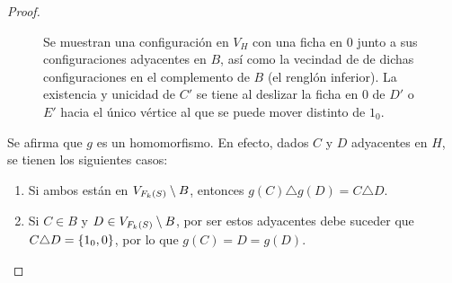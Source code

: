 \begin{proof}
\begin{figure}[!htbp]
        \captionsetup{font=footnotesize}
        \caption{Se muestran una configuraci\'on en $V_H$ con una ficha en $0$
        junto a sus configuraciones adyacentes en $B$, as\'i como la vecindad de
        de dichas configuraciones en el complemento de $B$ (el rengl\'on
        inferior). La existencia y unicidad de $C'$ se tiene al deslizar la
        ficha en $0$ de $D'$ o $E'$ hacia el \'unico v\'ertice al que se puede
        mover distinto de $1_0$.}
        \label{fig:domino}
    \end{figure}

    \newpage

    Se afirma que $g$ es un homomorfismo. En efecto, dados $C$ y $D$ adyacentes
    en $H$, se tienen los siguientes casos:
    \begin{enumerate}
        \item Si ambos est\'an en $V_{F_{k}\left( S\right)}\setminus B$, entonces
        $g(C)\triangle g(D)=C\triangle D$.

        \item Si $C\in B$ y $D\in V_{F_{k}\left( S\right)}\setminus B$, por ser estos
        adyacentes debe suceder que $C\triangle D=\left\{ 1_0,0\right\}$, por lo que
        $g(C)=D=g(D)$.


\end{enumerate}
\end{proof}
